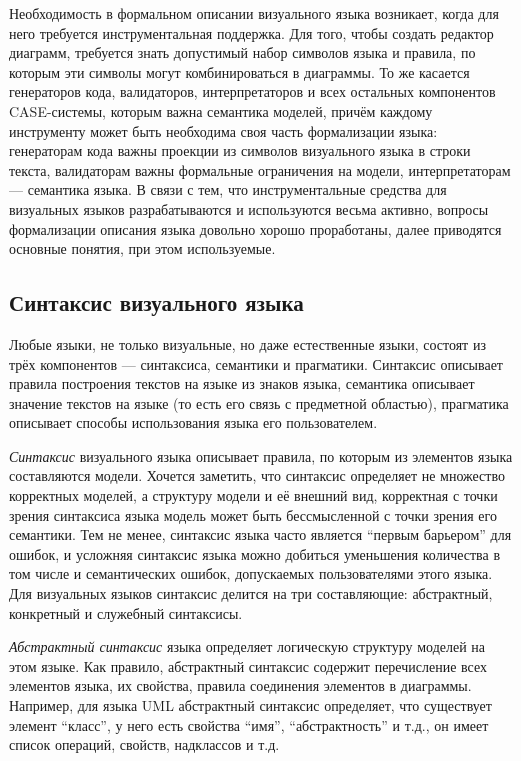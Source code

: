 Необходимость в формальном описании визуального языка возникает, когда для него 
требуется инструментальная поддержка. Для того, чтобы создать редактор диаграмм, 
требуется знать допустимый набор символов языка и правила, по которым эти 
символы могут комбинироваться в диаграммы. То же касается генераторов кода, 
валидаторов, интерпретаторов и всех остальных компонентов CASE-системы, которым 
важна семантика моделей, причём каждому инструменту может быть необходима своя 
часть формализации языка: генераторам кода важны проекции из символов 
визуального языка в строки текста, валидаторам важны формальные ограничения на 
модели, интерпретаторам --- семантика языка. В связи с тем, что инструментальные 
средства для визуальных языков разрабатываются и используются весьма активно, 
вопросы формализации описания языка довольно хорошо проработаны, далее 
приводятся основные понятия, при этом используемые.

\subsection{Синтаксис визуального языка}
Любые языки, не только визуальные, но даже естественные языки, состоят из трёх 
компонентов --- синтаксиса, семантики и прагматики. 
Синтаксис описывает правила 
построения текстов на языке из знаков языка, семантика описывает значение 
текстов на языке (то есть его связь с предметной областью), прагматика описывает 
способы использования языка его пользователем.

\textit{Синтаксис} визуального языка описывает правила, по которым из элементов языка 
составляются модели. Хочется заметить, что синтаксис определяет не множество 
корректных моделей, а структуру модели и её внешний вид, корректная с точки 
зрения синтаксиса языка модель может быть бессмысленной с точки зрения его 
семантики. Тем не менее, синтаксис языка часто является "`первым барьером"' для 
ошибок, и усложняя синтаксис языка можно добиться уменьшения количества в том 
числе и семантических ошибок, допускаемых пользователями этого языка. Для 
визуальных языков синтаксис делится на три составляющие: абстрактный, 
конкретный и служебный синтаксисы.

\textit{Абстрактный синтаксис} языка определяет логическую структуру моделей на этом 
языке. Как правило, абстрактный синтаксис содержит перечисление всех элементов 
языка, их свойства, правила соединения элементов в диаграммы. Например, для 
языка UML абстрактный синтаксис определяет, что существует элемент "`класс"', 
у него есть свойства "`имя"', "`абстрактность"' и т.д., он имеет список 
операций, свойств, надклассов и т.д.


